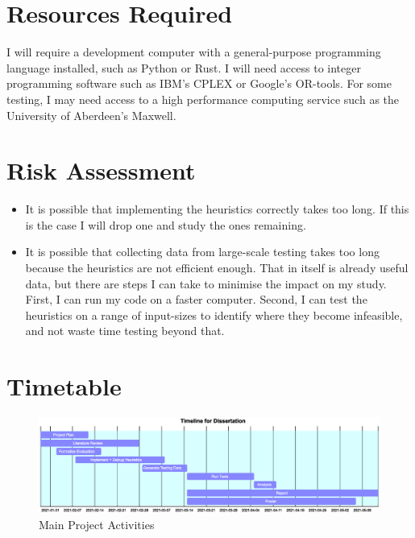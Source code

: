 \documentclass[a4paper,12pt]{article}
\begin{document}
\section*{Resources Required}

I will require a development computer with a general-purpose programming
language installed, such as Python or Rust. I will need access to integer
programming software such as IBM's CPLEX or Google's OR-tools. For some
testing, I may need access to a high performance computing service such
as the University of Aberdeen's Maxwell.

\section*{Risk Assessment}

\begin{itemize}
\item It is possible that implementing the heuristics correctly takes too long.
      If this is the case I will drop one and study the ones remaining.
\item It is possible that collecting data from large-scale testing takes too long
      because the heuristics are not efficient enough. That in itself is already
      useful data, but there are steps I can take to minimise the impact on my
      study. First, I can run my code on a faster computer. Second, I can test
      the heuristics on a range of input-sizes to identify where they become
      infeasible, and not waste time testing beyond that.
\end{itemize}

\section*{Timetable}

\begin{figure}[htb]
\begin{center}
\includegraphics[scale=0.4]{gantt.eps}
\caption{Main Project Activities\label{fig:plan}}
\end{center}
\end{figure}


\end{document}
